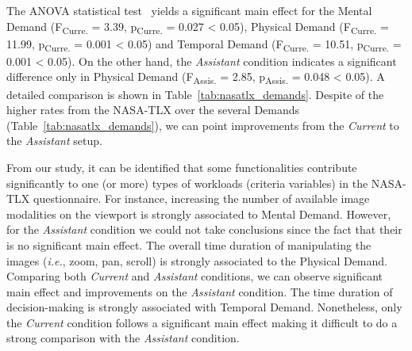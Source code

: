 
The ANOVA statistical test~\cite{Wobbrock:2011:ART:1978942.1978963, mathews2017usability} yields a significant main effect for the Mental Demand (F\textsubscript{Curre.} = 3.39, p\textsubscript{Curre.} = 0.027 < 0.05), Physical Demand (F\textsubscript{Curre.} = 11.99, p\textsubscript{Curre.} = 0.001 < 0.05) and Temporal Demand (F\textsubscript{Curre.} = 10.51, p\textsubscript{Curre.} = 0.001 < 0.05).
On the other hand, the {\it Assistant} condition indicates a significant difference only in Physical Demand (F\textsubscript{Assis.} = 2.85, p\textsubscript{Assis.} = 0.048 < 0.05). A detailed comparison is shown in Table~\ref{tab:nasatlx_demands}.
Despite of the higher rates from the NASA-TLX over the several Demands (Table~\ref{tab:nasatlx_demands}), we can point improvements from the {\it Current} to the {\it Assistant} setup.



From our study, it can be identified that some functionalities contribute significantly to one (or more) types of workloads (criteria variables) in the NASA-TLX questionnaire.
For instance, increasing the number of available image modalities on the viewport is strongly associated to Mental Demand.
However, for the {\it Assistant} condition we could not take conclusions since the fact that their is no significant main effect.
The overall time duration of manipulating the images ({\it i.e.}, zoom, pan, scroll) is strongly associated to the Physical Demand.
Comparing both {\it Current} and {\it Assistant} conditions, we can observe significant main effect and improvements on the {\it Assistant} condition.
The time duration of decision-making is strongly associated with Temporal Demand.
Nonetheless, only the {\it Current} condition follows a significant main effect making it difficult to do a strong comparison with the {\it Assistant} condition.

